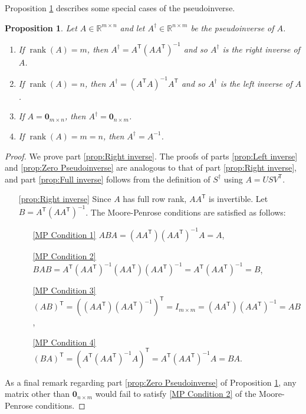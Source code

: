 \documentclass[12pt]{article}
\newcommand{\trans}[1]{{#1}^\mathsf{T}}	%
\newcommand{\inv}[1]{{#1}^{-1}}	%
\newcommand{\pinv}[1]{{#1}^\dagger}	%
\DeclareMathOperator{\rank}{rank}	%
\newcommand{\zeroVec}{\bm{0}}	%
\newtheorem{proposition}{Proposition}[section]
\begin{document}
Proposition \ref{prop:Special pseudoinverses} describes some special cases of the pseudoinverse.
\begin{proposition}
\label{prop:Special pseudoinverses}
Let $A \in \mathbb{R}^{m \times n}$ and let $\pinv{A} \in \mathbb{R}^{n \times m}$ be the pseudoinverse of $A$.
    \begin{enumerate}[label={(\roman*)}]
    \item If $\rank(A) = m$, then $\pinv{A} = \trans{A}\inv{\left(A\trans{A}\right)}$ and so $\pinv{A}$ is the right inverse of $A$. \label{prop:Right inverse}
    \item If $\rank(A) = n$, then $\pinv{A} = \inv{\left(\trans{A}A\right)}\trans{A}$ and so $\pinv{A}$ is the left inverse of $A$. \label{prop:Left inverse}
    \item If $A = \zeroVec_{m \times n}$, then $\pinv{A} = \zeroVec_{n \times m}$. \label{prop:Zero Pseudoinverse}
    \item If $\rank(A) = m = n$, then $\pinv{A} = \inv{A}$. \label{prop:Full inverse}
    \end{enumerate}
\end{proposition}
\begin{proof}
We prove part \ref{prop:Right inverse}. The proofs of parts \ref{prop:Left inverse} and \ref{prop:Zero Pseudoinverse} are analogous to that of part \ref{prop:Right inverse}, and part \ref{prop:Full inverse} follows from the definition of $\pinv{S}$ using $A = US\trans{V}$.
\begin{enumerate}
    \item[\ref{prop:Right inverse}] Since $A$ has full row rank, $A\trans{A}$ is invertible. Let $B = \trans{A}\inv{\left(A\trans{A}\right)}$. The Moore-Penrose conditions are satisfied as follows:
    \begin{enumerate}
        \item[\ref{MP Condition 1}] $ABA = \left(A\trans{A}\right)\inv{\left(A\trans{A}\right)}A = 
        A$,
        \item[\ref{MP Condition 2}] $BAB = \trans{A}\inv{\left(A\trans{A}\right)}\left(A\trans{A}\right)\inv{\left(A\trans{A}\right)} = \trans{A}\inv{\left(A\trans{A}\right)} = B$,
        \item[\ref{MP Condition 3}] $\trans{\left(AB\right)} = \trans{\left(\left(A\trans{A}\right)\inv{\left(A\trans{A}\right)}\right)} = I_{m \times m} = \left(A\trans{A}\right)\inv{\left(A\trans{A}\right)} = AB$,
        \item[\ref{MP Condition 4}] $\trans{\left(BA\right)} = \trans{\left(\trans{A}\inv{\left(A\trans{A}\right)}A\right)} = \trans{A}\inv{\left(A\trans{A}\right)}A = BA$.
    \end{enumerate}
\end{enumerate}
As a final remark regarding part \ref{prop:Zero Pseudoinverse} of Proposition \ref{prop:Special pseudoinverses}, any matrix other than $\zeroVec_{n \times m}$ would fail to satisfy \ref{MP Condition 2} of the Moore-Penrose conditions.
\end{proof}
\end{document}

